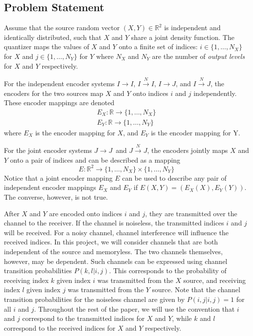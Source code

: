 \documentclass[10pt]{article}
\newcommand{\real}{\mathbb{R}}
\newcommand{\sysIIN}{\mbox{$I \overset{N}{\rightarrow} I$}}
\newcommand{\sysII}{\mbox{$I \rightarrow I$}}
\newcommand{\sysIJN}{\mbox{$I \overset{N}{\rightarrow} J$}}
\newcommand{\sysIJ}{\mbox{$I \rightarrow J$}}
\newcommand{\sysJJN}{\mbox{$J \overset{N}{\rightarrow} J$}}
\newcommand{\sysJJ}{\mbox{$J \rightarrow J$}}
\begin{document}
\subsection{Problem Statement}
\label{sec:prob_state}
Assume that the source random vector $(X,Y)\in\real^2$ is independent and identically distributed, such that $X$ and $Y$ share a joint density function. The quantizer maps the values of $X$ and $Y$ onto a finite set of indices: $i\in\{1,\ldots,N_X\}$ for $X$ and $j\in\{1,\ldots,N_Y\}$ for $Y$ where $N_X$ and $N_Y$ are the number of \emph{output levels} for $X$ and $Y$ respectively.

For the independent encoder systems \sysII, \sysIIN, \sysIJ, and \sysIJN, the encoders for the two sources map $X$ and $Y$ onto indices $i$ and $j$ independently. These encoder mappings are denoted
\begin{gather*}
    E_X : \real\to\{1,\ldots,N_X\} \\
    E_Y : \real\to\{1,\ldots,N_Y\}
\end{gather*}
where $E_X$ is the encoder mapping for $X$, and $E_Y$ is the encoder mapping for Y.

For the joint encoder systems \sysJJ\ and \sysJJN, the encoders jointly maps $X$ and $Y$ onto a pair of indices and can be described as a mapping
\begin{equation*}
    E : \real^2\to\{1,\ldots,N_X\} \times \{1,\ldots,N_Y\}
\end{equation*}
Notice that a joint encoder mapping $E$ can be used to describe any pair of independent encoder mappings $E_X$ and $E_Y$ if $E(X,Y) = (E_X(X),E_Y(Y))$. The converse, however, is not true.

After $X$ and $Y$ are encoded onto indices $i$ and $j$, they are transmitted over the channel to the receiver. If the channel is noiseless, the transmitted indices $i$ and $j$ will be received. For a noisy channel, channel interference will influence the received indices. In this project, we will consider channels that are both independent of the source and memoryless. The two channels themselves, however, may be dependent. Such channels can be expressed using channel transition probabilities $P(k,l|i,j)$. This corresponds to the probability of receiving index $k$ given index $i$ was transmitted from the $X$ source, and receiving index $l$ given index $j$ was transmitted from the $Y$ source. Note that the channel transition probabilities for the noiseless channel are given by $P(i,j|i,j)=1$ for all $i$ and $j$. Throughout the rest of the paper, we will use the convention that $i$ and $j$ correspond to the transmitted indices for $X$ and $Y$, while $k$ and $l$ correspond to the received indices for $X$ and $Y$ respectively.
\end{document}
